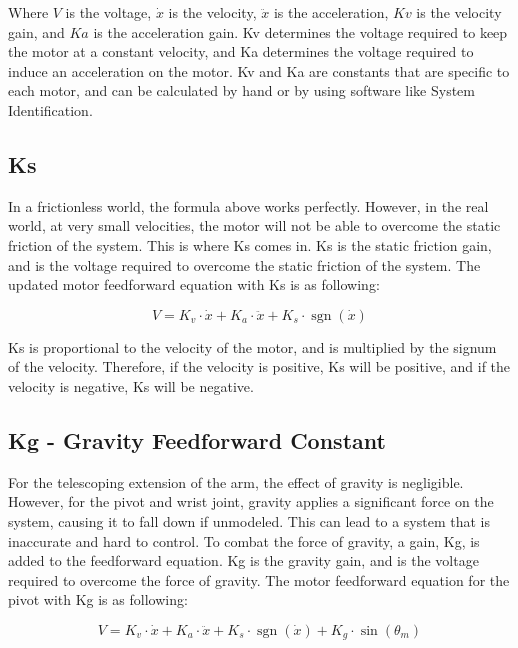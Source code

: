 \documentclass{scrartcl}
\DeclareMathOperator{\sgn}{sgn}
\begin{document}
Where \(V\) is the voltage, \(\dot{x}\) is the velocity, \(\ddot{x}\) is the acceleration, \(Kv\) is the velocity gain, and \(Ka\) is the acceleration gain. Kv determines the voltage required to keep the motor at a constant velocity, and Ka determines the voltage required to induce an acceleration on the motor. Kv and Ka are constants that are specific to each motor, and can be calculated by hand or by using software like System Identification.

\subsection{Ks}
In a frictionless world, the formula above works perfectly. However, in the real world, at very small velocities, the motor will not be able to overcome the static friction of the system. This is where Ks comes in. Ks is the static friction gain, and is the voltage required to overcome the static friction of the system. The updated motor feedforward equation with Ks is as following:

\begin{equation} \label{Motor Feedforward Equation with Static Friction}
    V = K_v \cdot \dot{x} + K_a \cdot \ddot{x} + K_s \cdot \sgn(\dot{x})
\end{equation}

Ks is proportional to the velocity of the motor, and is multiplied by the signum of the velocity. Therefore, if the velocity is positive, Ks will be positive, and if the velocity is negative, Ks will be negative.

\subsection{Kg - Gravity Feedforward Constant}
For the telescoping extension of the arm, the effect of gravity is negligible. However, for the pivot and wrist joint, gravity applies a significant force on the system, causing it to fall down if unmodeled. This can lead to a system that is inaccurate and hard to control. To combat the force of gravity, a gain, Kg, is added to the feedforward equation. Kg is the gravity gain, and is the voltage required to overcome the force of gravity. The motor feedforward equation for the pivot with Kg is as following:

\begin{equation} \label{Motor Feedforward Equation with Gravity Pivot}
    V = K_v \cdot \dot{x} + K_a \cdot \ddot{x} + K_s \cdot  \sgn(\dot{x}) + K_g \cdot \sin(\theta_{m})
\end{equation}
\end{document}
